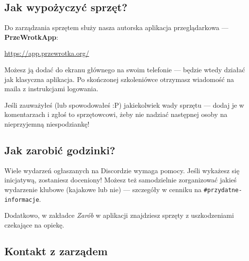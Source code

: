 \subsection*{Jak wypożyczyć sprzęt?}

Do zarządzania sprzętem służy nasza autorska aplikacja przeglądarkowa — \textbf{PrzeWrotkApp}:

\begin{center}
  \url{https://app.przewrotka.org/}
\end{center}

Możesz ją dodać do ekranu głównego na swoim telefonie — będzie wtedy działać jak klasyczna
aplikacja. Po skończonej szkoleniówce otrzymasz wiadomość na maila z instrukcjami logowania.

\begin{tipbox}
  Jeśli zauważyłeś (lub spowodowałeś :P) jakiekolwiek wady sprzętu — dodaj je
  w komentarzach i zgłoś to sprzętowcowi, żeby nie nadziać następnej osoby
  na nieprzyjemną niespodziankę!
\end{tipbox}

\subsection*{Jak zarobić godzinki?}

Wiele wydarzeń ogłaszanych na Discordzie wymaga pomocy. Jeśli wykażesz się inicjatywą,
zostaniesz doceniony! Możesz też samodzielnie zorganizować jakieś wydarzenie klubowe
(kajakowe lub nie) — szczegóły w cenniku na \texttt{\#przydatne-informacje}.

Dodatkowo, w zakładce \emph{Zarób} w aplikacji znajdziesz sprzęty z uszkodzeniami
czekające na opiekę.

\subsection*{Kontakt z zarządem}


